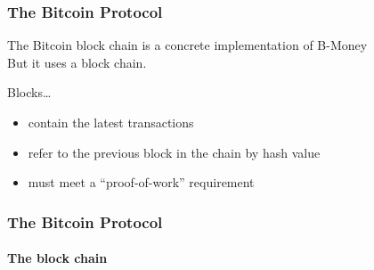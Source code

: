 \documentclass{beamer}
\begin{document}
\begin{frame}
\frametitle{The Bitcoin Protocol}
The Bitcoin block chain is a concrete implementation of B-Money\\
But it uses a block chain.
\begin{block}
{Blocks\ldots}
\begin{itemize}
\item contain the latest transactions
\item refer to the previous block in the chain by hash value
\item must meet a ``proof-of-work'' requirement
\end{itemize}
\end{block}
\end{frame}

\begin{frame}
\frametitle{The Bitcoin Protocol}
\framesubtitle{The block chain}
\begin{figure}[h!]
    \centering

\end{figure}
\end{frame}
\end{document}
